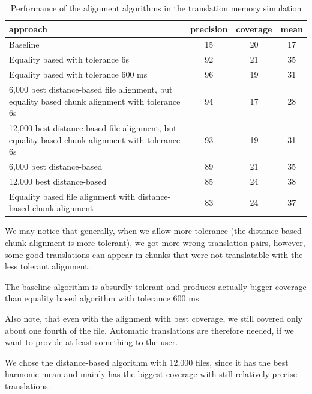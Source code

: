 \begin{table}[h]
\begin{center}
\begin{tabular}{|p{7cm}|c|c|c|} 
    \hline
    \textbf{approach} & \textbf{precision} & \textbf{coverage} & \textbf{mean} \\ \hline
    Baseline & 15 & 20 & 17 \\ \hline
    Equality based with tolerance 6s & 92 & 21 & 35 \\ \hline
    Equality based with tolerance 600 ms & 96 & 19 & 31 \\ \hline
    
    6,000 best distance-based file alignment, but equality based chunk alignment with tolerance 6s & 94 & 17 & 28 \\ \hline
    12,000 best distance-based file alignment, but equality based chunk alignment with tolerance 6s & 93 & 19 & 31 \\ \hline
    
    6,000 best distance-based & 89 & 21 & 35 \\ \hline
    12,000 best distance-based & 85 & 24 & 38 \\ \hline
    Equality based file alignment with distance-based chunk alignment & 83 & 24 & 37 \\ \hline
\end{tabular}
\end{center}

\caption{Performance of the alignment algorithms in the translation memory simulation}\label{tm_simulation}

\end{table}

We may notice that generally, when we allow more tolerance (the distance-based chunk alignment is more tolerant), we got more wrong translation pairs, however, some good translations can appear in chunks that were not translatable with the less tolerant alignment.

The baseline algorithm is absurdly tolerant and produces actually bigger coverage than equality based algorithm with tolerance 600 ms.

Also note, that even with the alignment with best coverage, we still covered only about one fourth of the file. Automatic translations are therefore needed, if we want to provide at least something to the user.

We chose the distance-based algorithm with 12,000 files, since it has the best harmonic mean and mainly has the biggest coverage with still relatively precise translations.

